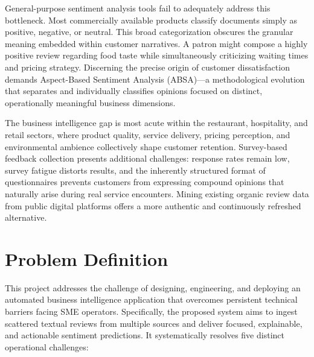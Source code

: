 \documentclass[12pt,a4paper]{report}
\begin{document}
General-purpose sentiment analysis tools fail to adequately address this bottleneck. Most commercially available products classify documents simply as positive, negative, or neutral. This broad categorization obscures the granular meaning embedded within customer narratives. A patron might compose a highly positive review regarding food taste while simultaneously criticizing waiting times and pricing strategy. Discerning the precise origin of customer dissatisfaction demands Aspect-Based Sentiment Analysis (ABSA)—a methodological evolution that separates and individually classifies opinions focused on distinct, operationally meaningful business dimensions.

The business intelligence gap is most acute within the restaurant, hospitality, and retail sectors, where product quality, service delivery, pricing perception, and environmental ambience collectively shape customer retention. Survey-based feedback collection presents additional challenges: response rates remain low, survey fatigue distorts results, and the inherently structured format of questionnaires prevents customers from expressing compound opinions that naturally arise during real service encounters. Mining existing organic review data from public digital platforms offers a more authentic and continuously refreshed alternative.

\section{Problem Definition}
This project addresses the challenge of designing, engineering, and deploying an automated business intelligence application that overcomes persistent technical barriers facing SME operators. Specifically, the proposed system aims to ingest scattered textual reviews from multiple sources and deliver focused, explainable, and actionable sentiment predictions. It systematically resolves five distinct operational challenges:
\end{document}
